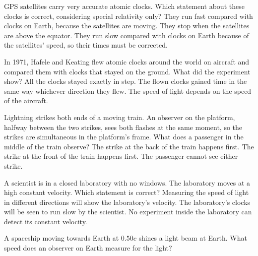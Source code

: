 \begin{quizq}{}
GPS satellites carry very accurate atomic clocks. Which statement about these clocks is correct,
considering special relativity only?
  {They run fast compared with clocks on Earth, because the satellites are moving.}
  {They stop when the satellites are above the equator.}
  {They run slow compared with clocks on Earth because of the satellites' speed, so their times must be
   corrected.}
\end{quizq}

\begin{quizq}{}
In 1971, Hafele and Keating flew atomic clocks around the world on aircraft and compared them with
clocks that stayed on the ground. What did the experiment show?
  {All the clocks stayed exactly in step.}
  {The flown clocks gained time in the same way whichever direction they flew.}
  {The speed of light depends on the speed of the aircraft.}
\end{quizq}

\begin{quizq}{}
Lightning strikes both ends of a moving train. An observer on the platform, halfway between the two
strikes, sees both flashes at the same moment, so the strikes are simultaneous in the platform's frame.
What does a passenger in the middle of the train observe?
  {The strike at the back of the train happens first.}
  {The strike at the front of the train happens first.}
  {The passenger cannot see either strike.}
\end{quizq}

\begin{quizq}{}
A scientist is in a closed laboratory with no windows. The laboratory moves at a high constant velocity.
Which statement is correct?
  {Measuring the speed of light in different directions will show the laboratory's velocity.}
  {The laboratory's clocks will be seen to run slow by the scientist.}
  {No experiment inside the laboratory can detect its constant velocity.}
\end{quizq}

\begin{quizq}{}
A spaceship moving towards Earth at $0.50c$ shines a light beam at Earth. What speed does an observer on
Earth measure for the light?
\end{quizq}

